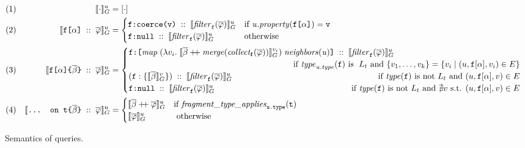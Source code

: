 \begin{figure}[t]
\small
    \centering
    \begin{align*}
    & (1) & \eval{\cdot}{u} &= [\cdot] \\
    & (2) & \evalu{\fld\; ::\; \queries} &= \begin{cases}
        \resp{\texttt{coerce(\val)}} \; ::\; \evalfilteru{\queries}{\fkey}  
        & \text{if } \mathit{u.property}(\fld) = \val \\
        \resp{\nval} \; :: \; \evalfilteru{\queries}{\fkey} 
        & \text{otherwise}
    \end{cases}\\
    & (3) & \evalu{\nfld{\overline{\beta}} \; ::\; \queries} &=
    \begin{cases}
        \resp{\texttt{[} \mathit{map}\; (\lambda v_{i}.\; \eval{\overline{\beta} \mdoubleplus \mathit{merge (collect_\fkey (\queries))}}{v_{i}})\; \mathit{neighbors(u)} \texttt{]}} \; :: \; \evalfilteru{\queries}{\fkey} \\  
        \hfill \text{ if } 
            \mathit{type}_{\mathit{u.type}}(\fkey) \text{ is } \; L_{t} \text{ and } \{v_{1}, \ldots, v_{k}\} = 
        \{v_{i} \mid (u, \fkey[\alpha], v_{i}) \in E\} \\
    (\fkey:\{\eval{\subqueries{\beta}}{v}\})\; :: \; \evalfilteru{\queries}{\fkey}  
        \hfill \text{ if } 
        \mathit{type(\fkey)} \text{ is not } L_{t} \text{ and } (u, \fkey[\alpha], v) \in E \\
    \resp{\nval}\; :: \; \evalfilteru{\queries}{\fkey} 
    \qquad \qquad \qquad \qquad \qquad \qquad \qquad \qquad
    \text{ if } \mathit{type(\fkey)} \text{ is not } L_{t}  \text{ and } \nexists v \text{ s.t. }  (u, \fkey[\alpha], v) \in E \\
    \end{cases}\\
    & (4) & \evalu{\ifrag{t}{\overline{\beta}}\; ::\; \queries} &= \begin{cases}
    \evalu{\overline{\beta} \mdoubleplus \queries} 
    & \text{if }\mathit{fragment\_type\_applies}_{\texttt{u.type}}(\texttt{t})\\
    \evalu{\queries} 
    & \text{ otherwise}
    \end{cases}
    \end{align*}
    \caption{Semantics of \gql queries.}
\end{figure}
